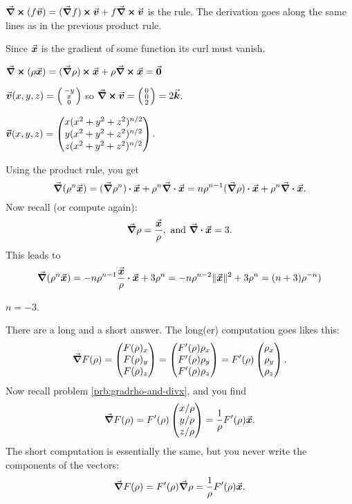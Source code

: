 \item[{\bf(4ii)}]

$\nab\cp(f\vv) = (\nab f)\cp\vv + f\nab\cp\vv$ is the rule.
The derivation goes along the same lines as in the previous product rule.
\bigskip

\item[{\bf(7ii)}]

Since $\vx$ is the gradient of some function its curl must vanish.
\bigskip

\item[{\bf(7iii)}]

$\nab\cp(\rho\vx) = (\nab \rho)\cp \vx + \rho \nab\cp\vx = \vvv0$
\bigskip

\item[{\bf(8)}]

$\vv(x, y, z) = \tvek -y \\x \\ 0\ttor$
so $\nab\cp\vv = \tvek 0\\0\\2\ttor = 2\vk$.
\bigskip

\item[{\bf(9i)}]

$\vv(x, y, z) =
\vek
   x(x^2+y^2+z^2)^{n/2} \\ y(x^2+y^2+z^2)^{n/2} \\ z(x^2+y^2+z^2)^{n/2}
\tor$.
\bigskip

\item[{\bf(9ii)}]

Using the product rule, you get
\[
\nab(\rho^{n}\vx)
= (\nab \rho^{n})\dpp\vx + \rho^{n}\nab\dpp\vx
= n\rho^{n-1}(\nab\rho)\dpp\vx + \rho^{n}\nab\dpp\vx.
\]
Now recall (or compute again):
\[
\nab \rho = \frac{\vx} {\rho}, \text{ and }
\nab\dpp\vx = 3.
\]
This leads to
\[
\nab(\rho^{n}\vx)
= - n \rho^{n-1}\frac{\vx} {\rho}\dpp\vx + 3 \rho^{n}
= - n \rho^{n-2}\|\vx\|^2 + 3 \rho^{n}
= (n+3) \rho^{-n})
\]
\bigskip

\item[{\bf(9iii)}]

$n=-3$.
\bigskip

\item[{\bf(10i)}]

There are a long and a short answer.
The long(er) computation goes likes this:
\[
\nab F(\rho)
= \vek F(\rho)_x\\ F(\rho)_y \\ F(\rho)_z\tor
= \vek F'(\rho)\rho_x\\ F'(\rho)\rho_y \\ F'(\rho)\rho_z\tor
= F'(\rho)\vek \rho_x\\\rho_y\\\rho_z\tor.
\]
Now recall problem \ref{prb:gradrho-and-divx}, and you find
\[
\nab F(\rho)
=F'(\rho)\vek x/\rho\\y/\rho\\z/\rho\tor
=\frac{1} {\rho}F'(\rho) \vx.
\]
The short computation is essentially the same, but you never
write the components of the vectors:
\[
\nab F(\rho) = F'(\rho) \nab \rho = \frac{1} {\rho}F'(\rho)\vx.
\]
\bigskip

